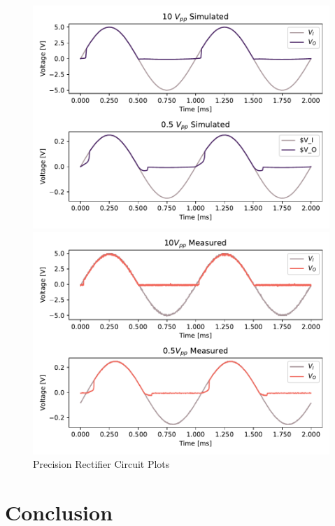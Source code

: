 \documentclass{../../ece-report}
\begin{document}
\begin{figure}[h!]
  \centering
  \begin{minipage}{.45\textwidth}
    \includegraphics[width=\textwidth]{../figures/precision/precision_sim.pdf}
  \end{minipage}
  \begin{minipage}{.45\textwidth}
    \includegraphics[width=\textwidth]{../figures/precision/precision_measured.pdf}
  \end{minipage}
  \caption{Precision Rectifier Circuit Plots}
  \label{fig:precision_plots}
\end{figure}

\section{Conclusion}
\end{document}
